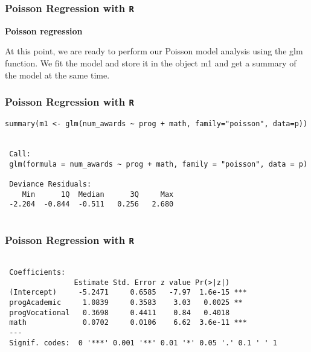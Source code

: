 \documentclass[00-GLMregslides.tex]{subfiles}
\begin{document}
\begin{frame}[fragile]

\frametitle{Poisson Regression with \texttt{R}}
\Large
 
\textbf{Poisson regression}
 
At this point, we are ready to perform our Poisson model analysis using the glm function. We fit the model and store it in the object m1 and get a summary of the model at the same time.

\end{frame}

\begin{frame}[fragile]

\frametitle{Poisson Regression with \texttt{R}}
\Large
\begin{framed}
	\begin{verbatim}
summary(m1 <- glm(num_awards ~ prog + math, family="poisson", data=p))
 
 
 Call:
 glm(formula = num_awards ~ prog + math, family = "poisson", data = p)
 
 Deviance Residuals: 
    Min      1Q  Median      3Q     Max  
 -2.204  -0.844  -0.511   0.256   2.680  
 
\end{verbatim}
\end{framed}
\end{frame}

\begin{frame}[fragile]

\frametitle{Poisson Regression with \texttt{R}}
\Large
\begin{framed}
\begin{verbatim}

 Coefficients:
                Estimate Std. Error z value Pr(>|z|)    
 (Intercept)     -5.2471     0.6585   -7.97  1.6e-15 ***
 progAcademic     1.0839     0.3583    3.03   0.0025 ** 
 progVocational   0.3698     0.4411    0.84   0.4018    
 math             0.0702     0.0106    6.62  3.6e-11 ***
 ---
 Signif. codes:  0 '***' 0.001 '**' 0.01 '*' 0.05 '.' 0.1 ' ' 1
 
\end{verbatim}
\end{framed}
\end{frame}
\end{document}
